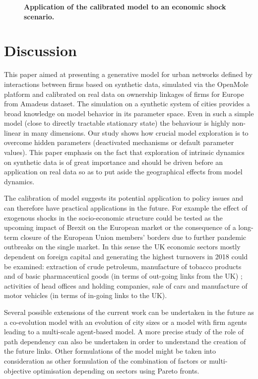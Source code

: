 \documentclass[10pt,letterpaper]{article}
\begin{document}
\begin{figure}
	\begin{center}
    \end{center}
	\caption{\textbf{Application of the calibrated model to an economic shock scenario.}\label{fig:fig9}}
\end{figure}



\section*{Discussion}

This paper aimed at presenting a generative model for urban networks defined by interactions between firms based on synthetic data, simulated via the OpenMole platform and calibrated on real data on ownership linkages of firms for Europe from Amadeus dataset. The simulation on a synthetic system of cities provides a broad knowledge on model behavior in its parameter space. Even in such a simple model (close to directly tractable stationary state) the behaviour is highly non-linear in many dimensions. Our study shows how crucial model exploration is to overcome hidden parameters (deactivated mechanisms or default parameter values). This paper emphasis on the fact that exploration of intrinsic dynamics on synthetic data is of great importance and should be driven before an application on real data so as to put aside the geographical effects from model dynamics.

The calibration of model suggests its potential application to policy issues and can therefore have practical applications in the future. For example the effect of exogenous shocks in the socio-economic structure could be tested as the upcoming impact of Brexit on the European market or the consequence of a long-term closure of the European Union members' borders due to further pandemic outbreaks on the single market. In this sense the UK economic sectors mostly dependent on foreign capital and generating the highest turnovers in 2018 could be examined: extraction of crude petroleum, manufacture of tobacco products and of basic pharmaceutical goods (in terms of out-going links from the UK) ; activities of head offices and holding companies, sale of cars and manufacture of motor vehicles (in terms of in-going links to the UK).

Several possible extensions of the current work can be undertaken in the future as a co-evolution model with an evolution of city sizes or a model with firm agents leading to a multi-scale agent-based model. A more precise study of the role of path dependency can also be undertaken in order to understand the creation of the future links. Other formulations of the model might be taken into consideration as other formulation of the combination of factors or multi-objective optimisation depending on sectors using Pareto fronts.  
\end{document}
